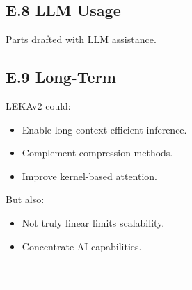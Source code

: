 \subsection{E.8 LLM Usage}

Parts drafted with LLM assistance.

\subsection{E.9 Long-Term}

LEKAv2 could:
\begin{itemize}
\item Enable long-context efficient inference.
\item Complement compression methods.
\item Improve kernel-based attention.

\end{itemize}
But also:
\begin{itemize}
\item Not truly linear limits scalability.
\item Concentrate AI capabilities.
\end{itemize}
\begin{lstlisting}

---
\end{lstlisting}